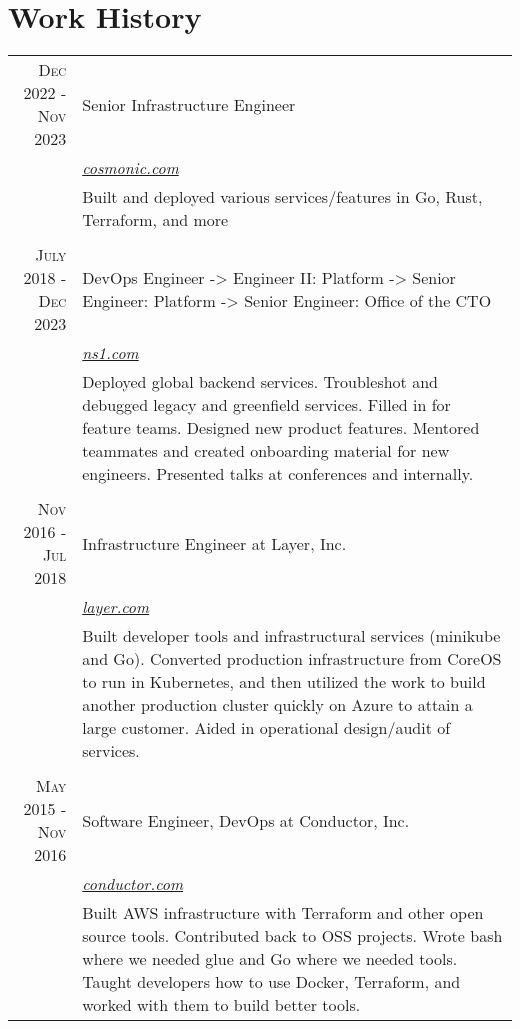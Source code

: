 \documentclass[a4paper, 10pt, onepage]{article} %
\begin{document}
\section{Work History}
\begin{tabular}{r|p{10cm}}
\textsc{Dec 2022 - Nov 2023} & {Senior Infrastructure Engineer}\\
&\small\emph{\href{https://cosmonic.com}{cosmonic.com}}\\
&\footnotesize{Built and deployed various services/features in Go, Rust, Terraform, and more}\\

\multicolumn{2}{c}{}\\
\textsc{July 2018 - Dec 2023} & {DevOps Engineer -> Engineer II: Platform -> Senior Engineer: Platform -> Senior Engineer: Office of the CTO}\\
&\small\emph{\href{https://ns1.com}{ns1.com}}\\
&\footnotesize{Deployed global backend services. Troubleshot and debugged legacy and greenfield services. Filled in for feature teams. Designed new product features. Mentored teammates and created onboarding material for new engineers. Presented talks at conferences and internally.}\\

\multicolumn{2}{c}{}\\
\textsc{Nov 2016 - Jul 2018} & {Infrastructure Engineer at Layer, Inc.}\\
&\small\emph{\href{https://layer.com}{layer.com}}\\
&\footnotesize{Built developer tools and infrastructural services (minikube and Go). Converted production infrastructure from CoreOS to run in Kubernetes, and then utilized the work to build another production cluster quickly on Azure to attain a large customer. Aided in operational design/audit of services.}\\

\multicolumn{2}{c}{}\\
\textsc{May 2015 - Nov 2016} & {Software Engineer, DevOps at Conductor, Inc.}\\
&\small\emph{\href{https://conductor.com}{conductor.com}}\\
&\footnotesize{Built AWS infrastructure with Terraform and other open source tools. Contributed back to OSS projects. Wrote bash where we needed glue and Go where we needed tools. Taught developers how to use Docker, Terraform, and worked with them to build better tools.}\\


\end{tabular}
\end{document}
